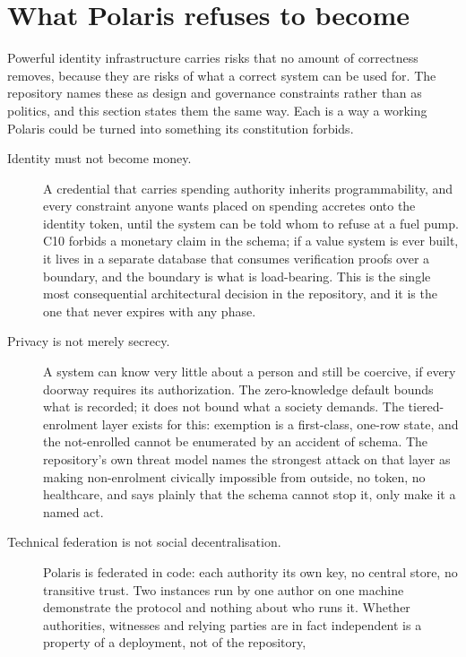 \section{What Polaris refuses to become}
\label{sec:boundaries}

Powerful identity infrastructure carries risks that no amount of correctness removes, because they
are risks of what a correct system can be used for. The repository names these as design and
governance constraints rather than as politics, and this section states them the same way. Each is
a way a working Polaris could be turned into something its constitution forbids.

\begin{description}
  \item[Identity must not become money.] A credential that carries spending authority inherits
    programmability, and every constraint anyone wants placed on spending accretes onto the identity
    token, until the system can be told whom to refuse at a fuel pump. C10 forbids a monetary claim
    in the schema; if a value system is ever built, it lives in a separate database that consumes
    verification proofs over a boundary, and the boundary is what is load-bearing. This is the single
    most consequential architectural decision in the repository, and it is the one that never
    expires with any phase.
  \item[Privacy is not merely secrecy.] A system can know very little about a person and still be
    coercive, if every doorway requires its authorization. The zero-knowledge default bounds what is
    recorded; it does not bound what a society demands. The tiered-enrolment layer exists for this:
    exemption is a first-class, one-row state, and the not-enrolled cannot be enumerated by an
    accident of schema. The repository's own threat model names the strongest attack on that layer as
    making non-enrolment civically impossible from outside, no token, no healthcare, and says plainly
    that the schema cannot stop it, only make it a named act.
  \item[Technical federation is not social decentralisation.] Polaris is federated in code: each
    authority its own key, no central store, no transitive trust. Two instances run by one author on
    one machine demonstrate the protocol and nothing about who runs it. Whether authorities, witnesses
    and relying parties are in fact independent is a property of a deployment, not of the repository,

\end{description}
